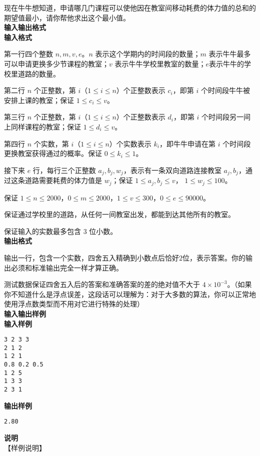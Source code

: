 \begin{example}
		现在牛牛想知道，申请哪几门课程可以使他因在教室间移动耗费的体力值的总和的期望值最小，请你帮他求出这个最小值。\\
		\textbf{输入输出格式}\\
		\textbf{输入格式}

		第一行四个整数 $n,m,v,e$。$n$ 表示这个学期内的时间段的数量；$m$ 表示牛牛最多可以申请更换多少节课程的教室；$v$ 表示牛牛学校里教室的数量；$e$表示牛牛的学校里道路的数量。

		第二行 $n$ 个正整数，第 $i$（$1 \leq i \leq n$）个正整数表示 $c_i$，即第 $i$ 个时间段牛牛被安排上课的教室；保证 $1 \le c_i \le v$。

		第三行 $n$ 个正整数，第 $i$（$1 \leq i \leq n$）个正整数表示 $d_i$，即第 $i$ 个时间段另一间上同样课程的教室；保证 $1 \le d_i \le v$。

		第四行 $n$ 个实数，第 $i$（$1 \leq i \leq n$）个实数表示 $k_i$，即牛牛申请在第 $i$ 个时间段更换教室获得通过的概率。保证 $0 \le k_i \le 1$。

		接下来 $e$ 行，每行三个正整数 $a_j, b_j, w_j$，表示有一条双向道路连接教室 $a_j, b_j$，通过这条道路需要耗费的体力值是 $w_j$；保证 $1 \le a_j, b_j \le v$， $1 \le w_j \le 100$。

		保证 $1 \leq n \leq 2000$，$0 \leq m \leq 2000$，$1 \leq v \leq 300$，$0 \leq e \leq 90000$。

		保证通过学校里的道路，从任何一间教室出发，都能到达其他所有的教室。

		保证输入的实数最多包含 $3$ 位小数。\\
		\textbf{输出格式}

		输出一行，包含一个实数，四舍五入精确到小数点后恰好$2$位，表示答案。你的输出必须和标准输出完全一样才算正确。

		测试数据保证四舍五入后的答案和准确答案的差的绝对值不大于 $4 \times 10^{-3}$。（如果你不知道什么是浮点误差，这段话可以理解为：对于大多数的算法，你可以正常地使用浮点数类型而不用对它进行特殊的处理）\ \\
		\textbf{输入输出样例}\\
		\textbf{输入样例}
		\begin{verbatim}
3 2 3 3
2 1 2
1 2 1
0.8 0.2 0.5 
1 2 5
1 3 3
2 3 1
\end{verbatim}
		\textbf{输出样例}
		\begin{verbatim}
2.80
\end{verbatim}
		\textbf{说明}\\
		【样例说明】


\end{example}
